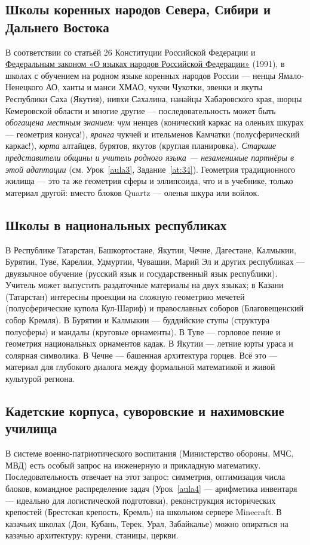 \documentclass[12pt,a4paper]{scrartcl}
\begin{document}
\subsection{Школы коренных народов Севера, Сибири и Дальнего Востока}
В соответствии со статьёй 26 Конституции Российской Федерации и \href{http://www.consultant.ru/document/cons_doc_LAW_15524/}{Федеральным законом «О языках народов Российской Федерации»} (1991), в школах с обучением на родном языке коренных народов России --- ненцы Ямало-Ненецкого АО, ханты и манси ХМАО, чукчи Чукотки, эвенки и якуты Республики Саха (Якутия), нивхи Сахалина, нанайцы Хабаровского края, шорцы Кемеровской области и многие другие --- последовательность может быть \emph{обогащена местным знанием}: \emph{чум} ненцев (конический каркас на оленьих шкурах --- геометрия конуса!), \emph{яранга} чукчей и ительменов Камчатки (полусферический каркас!), \emph{юрта} алтайцев, бурятов, якутов (круглая планировка). \emph{Старшие представители общины и учитель родного языка --- незаменимые партнёры в этой адаптации} (см. Урок~\ref{aula3}, Задание~\ref{at:34}). Геометрия традиционного жилища --- это та же геометрия сферы и эллипсоида, что и в учебнике, только материал другой: вместо блоков Quartz --- оленья шкура или войлок.

\subsection{Школы в национальных республиках}
В Республике Татарстан, Башкортостане, Якутии, Чечне, Дагестане, Калмыкии, Бурятии, Туве, Карелии, Удмуртии, Чувашии, Марий Эл и других республиках --- двуязычное обучение (русский язык и государственный язык республики). Учитель может выпустить раздаточные материалы на двух языках; в Казани (Татарстан) интересны проекции на сложную геометрию мечетей (полусферические купола Кул-Шариф) и православных соборов (Благовещенский собор Кремля). В Бурятии и Калмыкии --- буддийские ступы (структура полусферы) и мандалы (круговые орнаменты). В Туве --- горловое пение и геометрия национальных орнаментов кадак. В Якутии --- летние юрты ураса и солярная символика. В Чечне --- башенная архитектура горцев. Всё это --- материал для глубокого диалога между формальной математикой и живой культурой региона.

\subsection{Кадетские корпуса, суворовские и нахимовские училища}
В системе военно-патриотического воспитания (Министерство обороны, МЧС, МВД) есть особый запрос на инженерную и прикладную математику. Последовательность отвечает на этот запрос: симметрия, оптимизация числа блоков, командное распределение задач (Урок~\ref{aula4} --- арифметика инвентаря --- идеально для логистической подготовки), реконструкция исторических крепостей (Брестская крепость, Кремль) на школьном сервере Minecraft. В казачьих школах (Дон, Кубань, Терек, Урал, Забайкалье) можно опираться на казачью архитектуру: курени, станицы, церкви.
\end{document}
